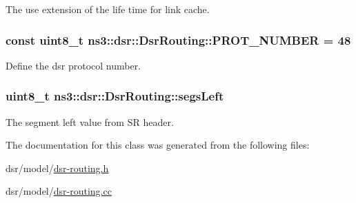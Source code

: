 The use extension of the life time for link cache. 

\subsubsection[{\texorpdfstring{P\+R\+O\+T\+\_\+\+N\+U\+M\+B\+ER}{PROT_NUMBER}}]{\setlength{\rightskip}{0pt plus 5cm}const uint8\+\_\+t ns3\+::dsr\+::\+Dsr\+Routing\+::\+P\+R\+O\+T\+\_\+\+N\+U\+M\+B\+ER = 48\hspace{0.3cm}{\ttfamily [static]}}\hypertarget{classns3_1_1dsr_1_1DsrRouting_a66248f69fcf97af91d6fe17d70617cc9}{}\label{classns3_1_1dsr_1_1DsrRouting_a66248f69fcf97af91d6fe17d70617cc9}


Define the dsr protocol number. 

\subsubsection[{\texorpdfstring{segs\+Left}{segsLeft}}]{\setlength{\rightskip}{0pt plus 5cm}uint8\+\_\+t ns3\+::dsr\+::\+Dsr\+Routing\+::segs\+Left\hspace{0.3cm}{\ttfamily [private]}}\hypertarget{classns3_1_1dsr_1_1DsrRouting_a2089307bfbe378b6cd8b274b38f70bb9}{}\label{classns3_1_1dsr_1_1DsrRouting_a2089307bfbe378b6cd8b274b38f70bb9}


The segment left value from SR header. 



The documentation for this class was generated from the following files\+:\begin{DoxyCompactItemize}
\item 
dsr/model/\hyperlink{dsr-routing_8h}{dsr-\/routing.\+h}\item 
dsr/model/\hyperlink{dsr-routing_8cc}{dsr-\/routing.\+cc}\end{DoxyCompactItemize}
